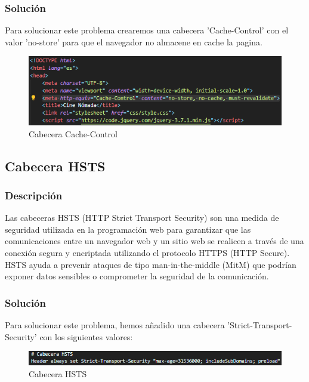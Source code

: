 \documentclass{report}
\begin{document}
                \subsubsection{Solución}
                    Para solucionar este problema crearemos una cabecera 'Cache-Control' con el valor 'no-store' para que el navegador no almacene en cache la pagina.
                    \begin{figure}[H]
                        \centering
                        \includegraphics[width=\textwidth]{./img/vulnerabilidades/3.5/3.1.png}
                        \caption{Cabecera Cache-Control}
                    \end{figure}
            \clearpage
            \subsection{Cabecera HSTS}
                \subsubsection{Descripción}
                    Las cabeceras HSTS (HTTP Strict Transport Security) son una medida de seguridad utilizada en la programación web para garantizar que las comunicaciones entre un navegador web y un sitio web se realicen a través de una conexión segura y encriptada utilizando el protocolo HTTPS (HTTP Secure). HSTS ayuda a prevenir ataques de tipo man-in-the-middle (MitM) que podrían exponer datos sensibles o comprometer la seguridad de la comunicación.
                \subsubsection{Solución}
                    Para solucionar este problema, hemos añadido una cabecera 'Strict-Transport-Security' con los siguientes valores:
                    \begin{figure}[H]
                        \centering
                        \includegraphics[width=\textwidth]{./img/vulnerabilidades/3.5/4.1.png}
                        \caption{Cabecera HSTS}
                    \end{figure}
            \clearpage
\end{document}
